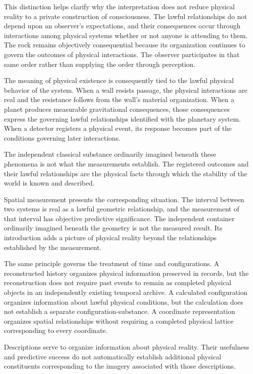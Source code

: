 \documentclass[12pt,onecolumn]{article}
\begin{document}
This distinction helps clarify why the interpretation does not reduce physical reality to a private construction of consciousness. The lawful relationships do not depend upon an observer's expectations, and their consequences occur through interactions among physical systems whether or not anyone is attending to them. The rock remains objectively consequential because its organization continues to govern the outcomes of physical interactions. The observer participates in that same order rather than supplying the order through perception.

The meaning of physical existence is consequently tied to the lawful physical behavior of the system. When a wall resists passage, the physical interactions are real and the resistance follows from the wall's material organization. When a planet produces measurable gravitational consequences, those consequences express the governing lawful relationships identified with the planetary system. When a detector registers a physical event, its response becomes part of the conditions governing later interactions.

The independent classical substance ordinarily imagined beneath these phenomena is not what the measurements establish. The registered outcomes and their lawful relationships are the physical facts through which the stability of the world is known and described.

Spatial measurement presents the corresponding situation. The interval between two systems is real as a lawful geometric relationship, and the measurement of that interval has objective predictive significance. The independent container ordinarily imagined beneath the geometry is not the measured result. Its introduction adds a picture of physical reality beyond the relationships established by the measurement.

The same principle governs the treatment of time and configurations. A reconstructed history organizes physical information preserved in records, but the reconstruction does not require past events to remain as completed physical objects in an independently existing temporal archive. A calculated configuration organizes information about lawful physical conditions, but the calculation does not establish a separate configuration-substance. A coordinate representation organizes spatial relationships without requiring a completed physical lattice corresponding to every coordinate.

Descriptions serve to organize information about physical reality. Their usefulness and predictive success do not automatically establish additional physical constituents corresponding to the imagery associated with those descriptions.
\end{document}
